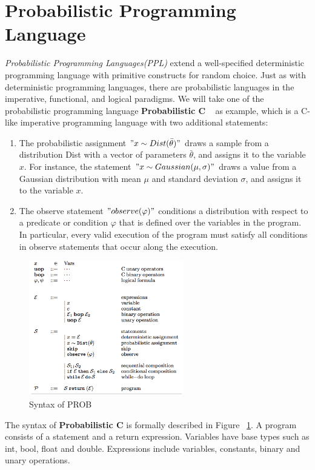 \section{Probabilistic Programming Language}
\label{sec:language}
\textit{Probabilistic Programming Languages(PPL)} extend a well-specified deterministic programming language with primitive constructs for random choice. Just as with deterministic programming languages, there are probabilistic languages in the imperative, functional, and logical paradigms. We will take one of the probabilistic programming language \textbf{Probabilistic C} ~\cite{probc} as example, which is a C-like imperative programming language with two additional statements:
\begin{enumerate}
  \item The probabilistic assignment $"x \sim Dist(\bar{\theta})"$ draws a sample from a distribution Dist with a vector of parameters $\bar{\theta}$, and assigns it to the variable $x$. For instance, the statement $"x \sim Gaussian(\mu, \sigma)"$ draws a value from a Gaussian distribution with mean $\mu$ and standard deviation $\sigma$, and assigns it to the variable $x$.
  \item The observe statement $"observe(\varphi)"$ conditions a distribution with respect to a predicate or condition $\varphi$ that is defined over the variables in the program. In particular, every valid execution of the program must satisfy all conditions in observe statements that occur along the execution.
\end{enumerate}

\begin{figure}
    \centering
    \includegraphics[width=0.6\textwidth]{figures/prob_syntax.png}
    \caption{Syntax of PROB}
    \label{fig:prob_syntax}
\end{figure}
The syntax of \textbf{Probabilistic C} is formally described in Figure ~\ref{fig:prob_syntax}. A program consists of a statement and a return expression. Variables have base types such as int, bool, float and double. Expressions include variables, constants, binary and unary operations.

